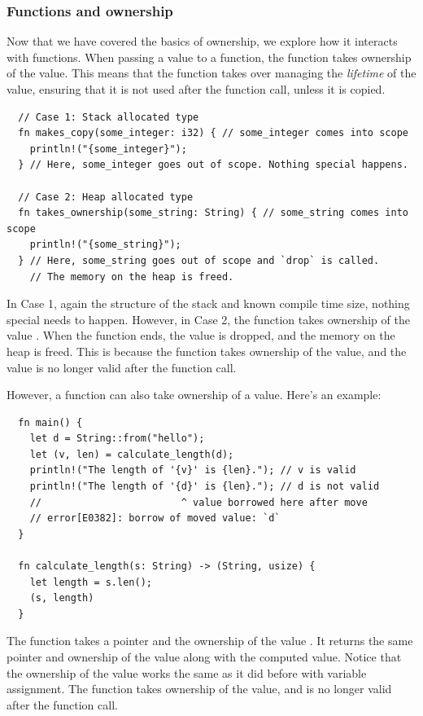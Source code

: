 \documentclass[11pt]{report}
\theoremstyle{definition}
\theoremstyle{plain}
\begin{document}
\subsubsection{Functions and ownership}\label{sub:rustlifetimes} %
Now that we have covered the basics of ownership, we explore how it interacts with functions. When passing a value to a function, the function takes ownership of the value. This means that the function takes over managing the \textit{lifetime} of the value, ensuring that it is not used after the function call, unless it is copied.
\begin{verbatim}
  // Case 1: Stack allocated type
  fn makes_copy(some_integer: i32) { // some_integer comes into scope
    println!("{some_integer}");
  } // Here, some_integer goes out of scope. Nothing special happens.

  // Case 2: Heap allocated type
  fn takes_ownership(some_string: String) { // some_string comes into scope
    println!("{some_string}");
  } // Here, some_string goes out of scope and `drop` is called.
    // The memory on the heap is freed.
\end{verbatim}

In Case 1, again the structure of the stack and known compile time size, nothing special needs to happen. However, in Case 2, the function  takes ownership of the  value . When the function ends, the  value is dropped, and the memory on the heap is freed. This is because the function takes ownership of the value, and the value is no longer valid after the function call.

However, a function can also take ownership of a value. Here's an example:
\begin{verbatim}
  fn main() {
    let d = String::from("hello");
    let (v, len) = calculate_length(d);
    println!("The length of '{v}' is {len}."); // v is valid
    println!("The length of '{d}' is {len}."); // d is not valid
    //                        ^ value borrowed here after move
    // error[E0382]: borrow of moved value: `d`
  }

  fn calculate_length(s: String) -> (String, usize) {
    let length = s.len();
    (s, length)
  }
\end{verbatim}
The function  takes a pointer and the ownership of the  value . It returns the same pointer and ownership of the value along with the computed value. Notice that the ownership of the value works the same as it did before with variable assignment. The function  takes ownership of the value, and  is no longer valid after the function call.
\end{document}
